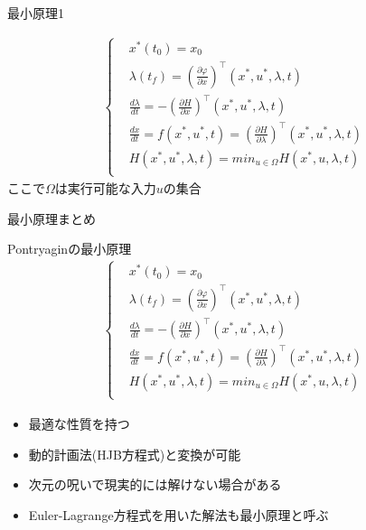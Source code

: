 \documentclass[twocolumn, dvipdfmx,12pt]{beamer}
\begin{document}
\begin{frame}{最小原理1}
\begin{multicols}{2}
            \begin{align*}
                \begin{cases}
                    &x^*(t_0)=x_0 \\
                    &\lambda(t_f)=\left(\frac{\partial \varphi}{\partial x}\right)^\top(x^*, u^*, \lambda, t) \\
                    &\frac{d\lambda}{dt}=-\left(\frac{\partial H}{\partial x}\right)^\top(x^*, u^*, \lambda, t)\\
                    &\frac{dx}{dt}=f(x^*,u^*,t)=\left(\frac{\partial H}{\partial \lambda}\right)^\top(x^*, u^*, \lambda, t) \\
                    &H(x^*, u^*, \lambda, t)=min _{u \in \Omega}H(x^*, u, \lambda, t)\\
                \end{cases}
            \end{align*}
            ここで$\Omega$は実行可能な入力$u$の集合


        \end{multicols}
    \end{frame}

    \begin{frame}{最小原理まとめ}
        \footnotesize

        \begin{block}{Pontryaginの最小原理}
            \begin{align*}
                \begin{cases}
                    &x^*(t_0)=x_0 \\
                    &\lambda(t_f)=\left(\frac{\partial \varphi}{\partial x}\right)^\top(x^*, u^*, \lambda, t) \\
                    &\frac{d\lambda}{dt}=-\left(\frac{\partial H}{\partial x}\right)^\top(x^*, u^*, \lambda, t)\\
                    &\frac{dx}{dt}=f(x^*,u^*,t)=\left(\frac{\partial H}{\partial \lambda}\right)^\top(x^*, u^*, \lambda, t) \\
                    &H(x^*, u^*, \lambda, t)=min _{u \in \Omega}H(x^*, u, \lambda, t)\\
                \end{cases}
            \end{align*}
        \end{block}
        
        \begin{itemize}
            \item 最適な性質を持つ
            \item 動的計画法(HJB方程式)と変換が可能
            \item 次元の呪いで現実的には解けない場合がある
            \item Euler-Lagrange方程式を用いた解法も最小原理と呼ぶ
        \end{itemize}

    \end{frame}
\end{document}
